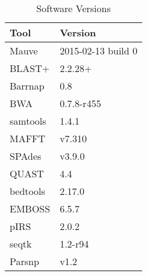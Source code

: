 \begin{table}[]
  \centering
  \caption{Software Versions}
  \label{table:software}
  \begin{tabular}{ll}
    \toprule
    Tool & Version \\
    \midrule
    Mauve & 2015-02-13 build 0 \\
    BLAST+ & 2.2.28+ \\
    Barrnap & 0.8 \\
    BWA & 0.7.8-r455 \\
    samtools & 1.4.1 \\
    MAFFT & v7.310 \\
    SPAdes & v3.9.0 \\
    QUAST & 4.4 \\
    bedtools & 2.17.0 \\
    EMBOSS & 6.5.7 \\
    pIRS & 2.0.2\\
    seqtk & 1.2-r94\\
    Parsnp & v1.2 \\
    \bottomrule
  \end{tabular}
\end{table}
